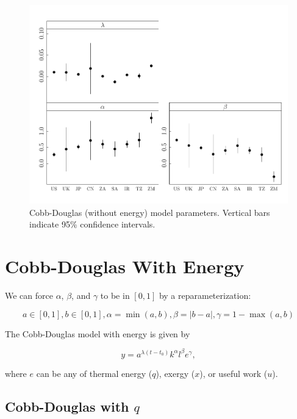 \documentclass[preprint,authoryear,12pt]{elsarticle}\usepackage{graphicx, color}
\makeatletter
\def\maxwidth{ %
  \ifdim\Gin@nat@width>\linewidth
    \linewidth
  \else
    \Gin@nat@width
  \fi
}
\newenvironment{knitrout}{}{} %
\makeatother
\begin{document}
\begin{knitrout}
\color{fgcolor}\begin{figure}[]

\includegraphics[width=\maxwidth]{figure/CD_Params_Graph} \caption[Cobb-Douglas (without energy) model parameters]{Cobb-Douglas (without energy) model parameters. Vertical bars indicate 95\% confidence intervals.\label{fig:CD_Params_Graph}}
\end{figure}


\end{knitrout}


\section{Cobb-Douglas With Energy}

We can force $\alpha$, $\beta$, and $\gamma$ to be in $[0,1]$ by a reparameterization:

\[ a \in[0,1], b \in [0,1], \alpha=\min(a,b), \beta=|b-a|, \gamma = 1-\max(a,b) \]

The Cobb-Douglas model with energy is given by

\begin{equation} \label{eq:CD_With_Energy}
  y = a^{\lambda (t-t_0)}k^{\alpha}l^{\beta}e^{\gamma},
\end{equation}

\noindent where $e$ can be any of thermal energy ($q$), exergy ($x$), or useful work ($u$).

\subsection{Cobb-Douglas with $q$}
\end{document}
